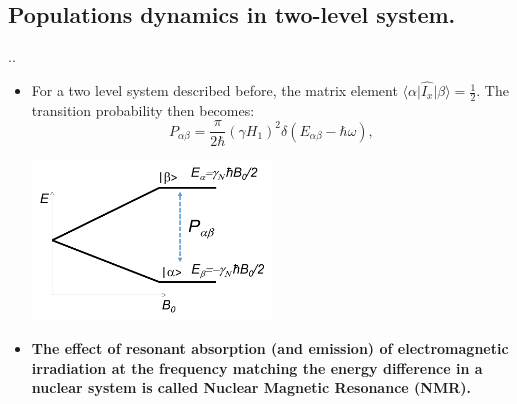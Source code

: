 \documentclass[handout]{beamer}
\begin{document}
\subsection{Populations dynamics in two-level system.}
\begin{frame}{\thesection.\thesubsection. \insertsubsection}
	\begin{itemize}[]
		\item 
		For a two level system described before, the matrix element $\langle \alpha \vert \hat{I_x} \vert \beta \rangle = \frac{1}{2}$. The transition probability then becomes:
		\begin{equation}\label{eq:two level transition probability}
		P_{\alpha \beta} = \frac{\pi}{2\hbar} (\gamma H_1)^2 \delta(E_{\alpha \beta}-\hbar \omega),
		\end{equation}
		\begin{minipage}{1.0\textwidth}
			\centering
			\includegraphics[width=0.5\textwidth]{two-level_excite.png}
		\end{minipage}
		\item
		\textbf{The effect of resonant absorption (and emission) of electromagnetic irradiation at the frequency matching the energy difference in a nuclear system is called Nuclear Magnetic Resonance (NMR).} 		    
		
		
	\end{itemize}
	
\end{frame}	
\end{document}
